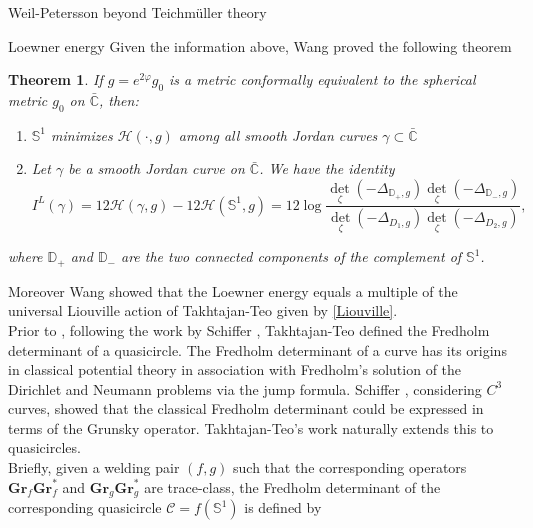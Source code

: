 \documentclass[12pt]{amsart}
\newcommand{\sphere}{\bar{\Bbb{C}}} %
\renewcommand{\Bbb}[1]{\ensuremath{\mathbb{#1}}}
\theoremstyle{plain}
\newtheorem{theorem}{Theorem}[section]
\theoremstyle{definition}
\theoremstyle{remark}
\numberwithin{equation}{section} %
\numberwithin{figure}{section} %
\begin{document}
\begin{section}{Weil-Petersson beyond Teichm\"uller theory}
\begin{subsection}{Loewner energy}
Given the information above, Wang \cite{wangzeta} proved the following theorem   \begin{theorem}\label{wangdetsewing}
 If \(g=e^{2 \varphi} g_{0}\) is a metric conformally equivalent to the spherical
metric \(g_{0}\) on \(\sphere\), then:
\begin{enumerate}[font=\upshape]
    \item $\mathbb{S}^1$ minimizes \(\mathscr{H}(\cdot, g)\) among all smooth Jordan curves $\gamma\subset \sphere$ 
    \item Let \(\gamma\) be a smooth Jordan curve on \(\sphere\). We have the identity
\begin{equation}\label{wangloewner}
    I^{L}(\gamma)=12 \mathscr{H}(\gamma, g)-12 \mathscr{H}\left(\mathbb{S}^{1}, g\right)=
    12 \log \frac{\operatorname{det}_{\zeta}\left(-\Delta_{\mathbb{D}_{+}, g}\right) \operatorname{det}_{\zeta}\left(-\Delta_{\mathbb{D}_{-}, g}\right)}{\operatorname{det}_{\zeta}\left(-\Delta_{D_{1}, g}\right) \operatorname{det}_{\zeta}\left(-\Delta_{D_{2}, g}\right)},
\end{equation}

\end{enumerate}
 
where \(\mathbb{D}_{+}\) and \(\mathbb{D}_{-}\) are the two connected components of the complement
of \(\mathbb{S}^{1}\).
\end{theorem}

Moreover Wang showed that the Loewner
energy equals a multiple of the universal Liouville action of
Takhtajan-Teo given by \eqref{Liouville}.\\ Prior to \cite{wangzeta}, following the work by Schiffer \cite{Schifferplane,Schiffer_multiply}, Takhtajan-Teo \cite{Takhtajan_Teo_Memoirs} defined the Fredholm determinant of a quasicircle. {The Fredholm determinant of a curve has its origins in classical potential theory in association with Fredholm's solution of the Dirichlet and Neumann problems via the jump formula.  Schiffer \cite{Schifferplane,Schiffer_multiply,Schiffer_rend_Fredholm,Schiffer_Pol}, considering $C^3$ curves, showed that the classical Fredholm determinant could be expressed in terms of the Grunsky operator.  Takhtajan-Teo's work naturally extends this to quasicircles. }\\ Briefly, given a welding pair $(f,g)$ such that the corresponding operators $\mathbf{Gr}_f \mathbf{Gr}_{f}^{\ast}$ and $\mathbf{Gr}_g \mathbf{Gr}_g^{\ast}$ are trace-class, the Fredholm determinant of the corresponding quasicircle $\mathscr{C}={f}\left(\mathbb{S}^{1}\right)$ is defined by


\end{subsection}
\end{section}
\end{document}
